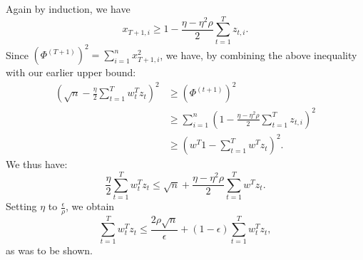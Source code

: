 \documentclass[11pt]{article}
\begin{document}
Again by induction, we have
\[ x_{T+1,i} \geq 1-\frac{\eta-\eta^2\rho}{2}\sum_{t=1}^T z_{t,i}. \]
Since $(\Phi^{(T+1)})^2 = \sum_{i=1}^n x_{T+1,i}^2$, we have, by combining 
the above inequality with our earlier upper bound:
\begin{align}
        (\sqrt{n}-\frac{\eta}{2}\sum_{t=1}^T w_t^Tz_t)^2 &\geq (\Phi^{(t+1)})^2 \\
                                                         &\geq \sum_{i=1}^n (1-\frac{\eta-\eta^2\rho}{2}\sum_{t=1}^T z_{t,i})^2 \\
                                                         &\geq (w^T1 - \sum_{t=1}^T w^Tz_t)^2.
\end{align}
We thus have:
\[ \frac{\eta}{2}\sum_{t=1}^T w_t^Tz_t \leq \sqrt{n} + \frac{\eta-\eta^2\rho}{2}\sum_{t=1}^T w^Tz_t. \]
Setting $\eta$ to $\frac{\epsilon}{\rho}$, we obtain
\[ \sum_{t=1}^T w_t^Tz_t \leq \frac{2\rho\sqrt{n}}{\epsilon} + (1-\epsilon)\sum_{t=1}^T w_t^Tz_t, \]
as was to be shown.
\end{document}
